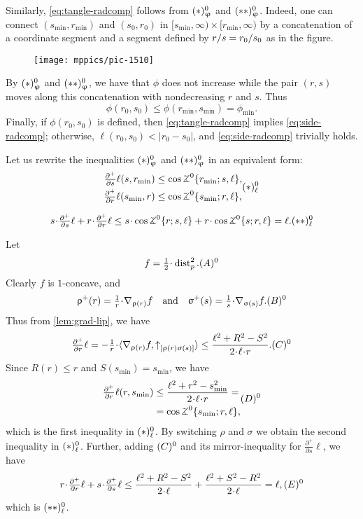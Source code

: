 Similarly, \ref{eq:tangle-radcomp} follows from  $(*)^{0}_\upvarphi$ and $(**)^{0}_\upvarphi$.
Indeed, one can connect $(s_{\min},r_{\min})$ and $(s_0,r_0)$ in $[s_{\min},\infty)\times[r_{\min},\infty)$ 
by a concatenation of a coordinate segment and a segment defined by $r/s\z=r_0/s_0$ as in the figure.
\begin{figure}[!ht]
\vskip-0mm
\centering
\texttt{[image: mppics/pic-1510]}
\vskip0mm
\end{figure}
By $(*)^{0}_\upvarphi$ and $(**)^{0}_\upvarphi$, we have that $\phi$ does not increase while the  pair $(r,s)$ moves along this concatenation with nondecreasing $r$ and $s$.
Thus 
\[\phi(r_0,s_0)\le\phi(r_{\min},s_{\min})=\phi_{\min}.\]
Finally, if $\phi(r_0,s_0)$ is defined, then \ref{eq:tangle-radcomp} implies \ref{eq:side-radcomp};
otherwise, $\ell(r_0,s_0)<|r_0-s_0|$, and \ref{eq:side-radcomp} trivially holds.

Let us rewrite the inequalities $(*)^{0}_\upvarphi$ and $(**)^{0}_\upvarphi$ in an equivalent form:
\[
\begin{aligned}
\tfrac{\partial^+}{\partial s}\ell(s,r_{\min})
&\le 
\cos\tangle\mc0\{r_{\min};s,\ell\},
\\
\tfrac{\partial^+}{\partial r}\ell(s_{\min},r)
&\le 
\cos\tangle\mc0\{s_{\min};r,\ell\},
\end{aligned}
\leqno(*)\mc0_\ell
\]

\[
s\cdot\tfrac{\partial^+}{\partial s}\ell
+
r\cdot\tfrac{\partial^+}{\partial r}\ell\le 
 s\cdot\cos\tangle\mc0\{r;s,\ell\}
+
r\cdot\cos\tangle\mc0\{s;r,\ell\}=\ell.
\leqno(**)\mc0_\ell
\]

Let 
\[f=\tfrac{1}{2}\cdot\distfun[2]{p}{}{}.\leqno(A)\mc0\] 
Clearly $f$ is $1$-concave, and
\[\rho^+(r)=\tfrac{1}{r}\cdot\nabla_{\rho(r)} f\quad \text{and}\quad \sigma^+(s)=\tfrac{1}{s}\cdot\nabla_{\sigma(s)} f.\leqno(B)\mc0\]
Thus from \ref{lem:grad-lip}, we have
\[\tfrac{\partial^+}{\partial r}\ell
=
-\tfrac{1}{r}\cdot\<\nabla_{\rho(r)} f,\dir{\rho(r)}{\sigma(s)}\>
\le\frac{{\ell^2}+{R^2}-{S^2}}{2\cdot\ell\cdot r}.\leqno(C)\mc0\]
Since $R(r)\le r$ and $S(s_{\min})=s_{\min}$, we have
\[
\begin{aligned}
\tfrac{\partial^+}{\partial r}\ell(r,s_{\min})
&\le
\frac{{\ell^2}+r^2-s_{\min}^2}{2\cdot\ell\cdot r}
=\\
&=
\cos\tangle\mc0\{s_{\min};r,\ell\},
\end{aligned}
\leqno(D)\mc0
\]
which is the first inequality in $(*)^{0}_\ell$.
By switching $\rho$ and $\sigma$ we obtain the second inequality in $(*)^{0}_\ell$.
Further, adding $(C)^{0}$ and its mirror-inequality for $\frac{\partial^+}{\partial s}\ell$, we have
\[r\cdot\tfrac{\partial^+}{\partial r}\ell
+
s\cdot\tfrac{\partial^+}{\partial s}\ell
\le 
\frac{{\ell^2}+{R^2}-{S^2}}{2\cdot\ell }+\frac{{\ell^2}+{S^2}-{R^2}}{2\cdot\ell }
= 
\ell,
\leqno(E)\mc0\]
which is $(**)^{0}_\ell$.
\qeds

